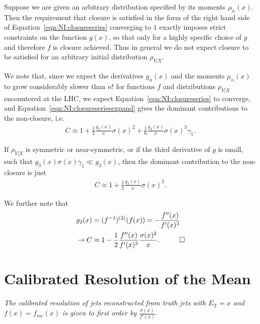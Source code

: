Suppose we are given an arbitrary distribution specified by its moments $\mu_n(x)$. Then the requirement that closure is satisfied in the form of the right hand side of Equation~\ref{eqn:NI:closureseries} converging to $1$ exactly imposes strict constraints on the function $g(x)$, so that only for a highly specific choice of $g$ and therefore $f$ is closure achieved. Thus in general we do not expect closure to be satisfied for an arbitrary initial distribution $\rho_{Y|X}$.

We note that, since we expect the derivatives $g_n(x)$ and the moments $\mu_n(x)$ to grow considerably slower than $n!$ for functions $f$ and distributions $\rho_{Y|X}$ encountered at the LHC, we expect Equation~\ref{eqn:NI:closureseries} to converge, and Equation~\ref{eqn:NI:closureseriesexpand} gives the dominant contributions to the non-closure, i.e.
\begin{align}
C \approx 1+\frac{1}{2}\frac{g_2(x)}{x}\sigma(x)^2+\frac{1}{6}\frac{g_3(x)}{x}\sigma(x)^3\gamma_1.
\end{align}

If $\rho_{Y|X}$ is symmetric or near-symmetric, or if the third derivative of $g$ is small, such that $g_3(x)\sigma(x)\gamma_1 \ll g_2(x)$, then the dominant contribution to the non-closure is just
\begin{align}
C \approx 1+\frac{1}{2}\frac{g_2(x)}{x}\sigma(x)^2.
\end{align}

\noindent We further note that
\begin{align}
g_2(x) &= (f^{-1})^{(2)}(f(x)) = -\frac{f''(x)}{f'(x)^3}\nonumber\\
\rightarrow C &\approx 1-\frac{1}{2}\frac{f''(x)}{f'(x)^3}\frac{\sigma(x)^2}{x}.\hspace{1 cm}\Box
\label{eqn:NI:closureseriesgaussian}
\end{align}

\newpage
\section{Calibrated Resolution of the Mean}
\label{sec:NI:calibrated_resolution_calculation}
{\it The calibrated resolution of jets reconstructed from truth jets with $E_\text{T} = x$ and $f(x)=f_{me}(x)$ is given to first order by $\frac{\sigma(x)}{f'(x)}$.}

\vspace{5mm}

